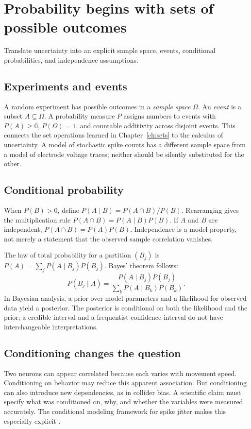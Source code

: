 \chapter{Probability begins with sets of possible outcomes}\label{ch:probability}
\begin{readergoal}Translate uncertainty into an explicit sample space, events, conditional probabilities, and independence assumptions.\end{readergoal}
\section{Experiments and events}
A random experiment has possible outcomes in a \emph{sample space} $\Omega$. An \emph{event} is a subset $A\subseteq\Omega$. A probability measure $P$ assigns numbers to events with $P(A)\ge0$, $P(\Omega)=1$, and countable additivity across disjoint events. This connects the set operations learned in Chapter~\ref{ch:sets} to the calculus of uncertainty. A model of stochastic spike counts has a different sample space from a model of electrode voltage traces; neither should be silently substituted for the other.

\section{Conditional probability}
When $P(B)>0$, define $P(A\mid B)=P(A\cap B)/P(B)$. Rearranging gives the multiplication rule $P(A\cap B)=P(A\mid B)P(B)$. If $A$ and $B$ are independent, $P(A\cap B)=P(A)P(B)$. Independence is a model property, not merely a statement that the observed sample correlation vanishes.

The law of total probability for a partition $(B_j)$ is $P(A)=\sum_jP(A\mid B_j)P(B_j)$. Bayes' theorem follows:
\[P(B_j\mid A)=\frac{P(A\mid B_j)P(B_j)}{\sum_kP(A\mid B_k)P(B_k)}.\]
In Bayesian analysis, a prior over model parameters and a likelihood for observed data yield a posterior. The posterior is conditional on both the likelihood and the prior; a credible interval and a frequentist confidence interval do not have interchangeable interpretations.

\section{Conditioning changes the question}
Two neurons can appear correlated because each varies with movement speed. Conditioning on behavior may reduce this apparent association. But conditioning can also introduce new dependencies, as in collider bias. A scientific claim must specify what was conditioned on, why, and whether the variables were measured accurately. The conditional modeling framework for spike jitter makes this especially explicit \cite{Amarasingham2012}.

